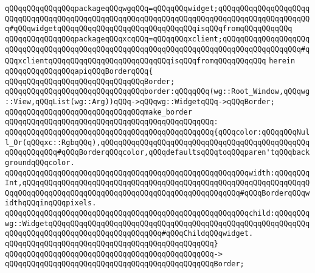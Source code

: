 \verb|qQQqqQQqqQQqqQQqpackageqQQqwgqQQq=qQQqqQQqwidget;qQQqqQQqqQQqqQQqqQQqqQQqqQQqqQQqqQQqqQQqqQQqqQQqqQQqqQQqqQQqqQQqqQQqqQQqqQQqqQQqqQQqqQQqqQQq#qQQqwidgetqQQqqQQqqQQqqQQqqQQqqQQqqQQqqQQqisqQQqfromqQQqqQQqqQQq|\newline
\verb|qQQqqQQqqQQqqQQqpackageqQQqxcqQQq=qQQqqQQqxclient;qQQqqQQqqQQqqQQqqQQqqQQqqQQqqQQqqQQqqQQqqQQqqQQqqQQqqQQqqQQqqQQqqQQqqQQqqQQqqQQqqQQqqQQq#qQQqxclientqQQqqQQqqQQqqQQqqQQqqQQqqQQqisqQQqfromqQQqqQQqqQQq|\newline
\verb|herein|\newline
\newline
\verb|qQQqqQQqqQQqqQQqapiqQQqBorderqQQq{|\newline
\newline
\verb|qQQqqQQqqQQqqQQqqQQqqQQqqQQqqQQqBorder;|\newline
\newline
\verb|qQQqqQQqqQQqqQQqqQQqqQQqqQQqqQQqborder:qQQqqQQq(wg::Root_Window,qQQqwg::View,qQQqList(wg::Arg))qQQq->qQQqwg::WidgetqQQq->qQQqBorder;|\newline
\newline
\verb|qQQqqQQqqQQqqQQqqQQqqQQqqQQqqQQqmake_border|\newline
\verb|qQQqqQQqqQQqqQQqqQQqqQQqqQQqqQQqqQQqqQQqqQQqqQQq:|\newline
\verb|qQQqqQQqqQQqqQQqqQQqqQQqqQQqqQQqqQQqqQQqqQQqqQQq{qQQqcolor:qQQqqQQqNull_Or(qQQqxc::RgbqQQq),qQQqqQQqqQQqqQQqqQQqqQQqqQQqqQQqqQQqqQQqqQQqqQQqqQQqqQQqqQQq#qQQqBorderqQQqcolor,qQQqdefaultsqQQqtoqQQqparen'tqQQqbackgroundqQQqcolor.|\newline
\verb|qQQqqQQqqQQqqQQqqQQqqQQqqQQqqQQqqQQqqQQqqQQqqQQqqQQqqQQqwidth:qQQqqQQqInt,qQQqqQQqqQQqqQQqqQQqqQQqqQQqqQQqqQQqqQQqqQQqqQQqqQQqqQQqqQQqqQQqqQQqqQQqqQQqqQQqqQQqqQQqqQQqqQQqqQQqqQQqqQQqqQQqqQQqqQQq#qQQqBorderqQQqwidthqQQqinqQQqpixels.|\newline
\verb|qQQqqQQqqQQqqQQqqQQqqQQqqQQqqQQqqQQqqQQqqQQqqQQqqQQqqQQqchild:qQQqqQQqwg::WidgetqQQqqQQqqQQqqQQqqQQqqQQqqQQqqQQqqQQqqQQqqQQqqQQqqQQqqQQqqQQqqQQqqQQqqQQqqQQqqQQqqQQqqQQqqQQqqQQq#qQQqChildqQQqwidget.|\newline
\verb|qQQqqQQqqQQqqQQqqQQqqQQqqQQqqQQqqQQqqQQqqQQqqQQq}|\newline
\verb|qQQqqQQqqQQqqQQqqQQqqQQqqQQqqQQqqQQqqQQqqQQqqQQq->|\newline
\verb|qQQqqQQqqQQqqQQqqQQqqQQqqQQqqQQqqQQqqQQqqQQqqQQqBorder;|\newline
